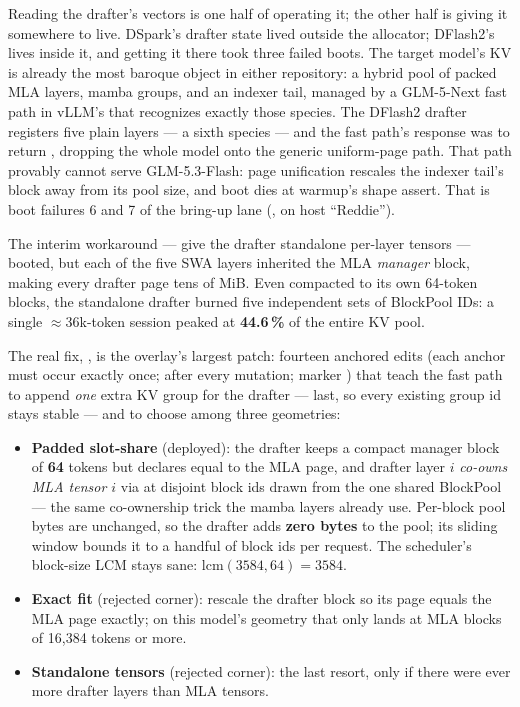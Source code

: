 Reading the drafter's vectors is one half of operating it; the other half
is giving it somewhere to live. DSpark's drafter state lived outside the
allocator; DFlash2's lives inside
it, and getting it there took three failed boots. The target model's KV is
already the most baroque object in either repository: a hybrid pool of packed
 MLA layers, mamba groups, and an indexer tail, managed by
a GLM-5-Next fast path in vLLM's  that
recognizes exactly those species. The DFlash2 drafter registers five plain
 layers --- a sixth species --- and the fast path's
response was to return , dropping the whole model onto the
generic uniform-page path. That path provably cannot serve GLM-5.3-Flash:
page unification rescales the indexer tail's block away from its pool size,
and boot dies at warmup's shape assert. That is boot failures 6 and 7 of the
bring-up lane (,  on
host ``Reddie'').

\begin{hbnote}
The interim workaround --- give the drafter standalone per-layer tensors ---
booted, but each of the five SWA layers inherited the MLA \emph{manager}
block, making every drafter page tens of MiB. Even compacted to its own
64-token blocks, the standalone drafter burned five independent sets of
BlockPool IDs: a single $\approx$36k-token session peaked at
\textbf{44.6\,\%} of the entire KV pool.
\end{hbnote}

The real fix, , is the
overlay's largest patch: fourteen anchored edits (each anchor must occur
exactly once;  after every mutation; marker
) that teach the fast path to append \emph{one}
extra KV group for the drafter --- last, so every existing group id stays
stable --- and to choose among three geometries:

\begin{itemize}
  \item \textbf{Padded slot-share} (deployed): the drafter keeps a compact
    manager block of \textbf{64} tokens but declares
     equal to the MLA page, and drafter layer $i$
    \emph{co-owns MLA tensor $i$} via  at disjoint block ids
    drawn from the one shared BlockPool --- the same co-ownership trick the
    mamba layers already use. Per-block pool bytes are unchanged, so the
    drafter adds \textbf{zero bytes} to the pool; its sliding window bounds
    it to a handful of block ids per request. The scheduler's block-size
    LCM stays sane: $\mathrm{lcm}(3584, 64) = 3584$.
  \item \textbf{Exact fit} (rejected corner): rescale the drafter block so
    its page equals the MLA page exactly; on this model's geometry that
    only lands at MLA blocks of 16{,}384 tokens or more.
  \item \textbf{Standalone tensors} (rejected corner): the last resort,
    only if there were ever more drafter layers than MLA tensors.
\end{itemize}

